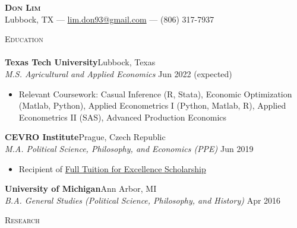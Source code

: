 \documentclass[a4paper]{article}
\newcommand{\lineunder} {
    \vspace*{-8pt} \\
    \hspace*{-18pt} \hrulefill \\
}
\newcommand{\header} [1] {
    {\hspace*{-18pt}\vspace*{6pt} \textsc{\large{#1}}}
    \vspace*{-6pt} \lineunder
}
\begin{document}
\vspace*{-40pt}

    

\vspace*{-10pt}
\begin{center}
	{\Huge \scshape \textbf{{Don Lim}}}\\
	Lubbock, TX --- \href{mailto:lim.don93@gmail.com}{lim.don93@gmail.com} --- (806) 317-7937\\
\end{center}

\header{Education}
\vspace{1mm}
\textbf{Texas Tech University}\hfill Lubbock, Texas\\
\textit{M.S. Agricultural and Applied Economics} \hfill Jun 2022 (expected)\\
\begin{itemize}[noitemsep,nolistsep]
	\item Relevant Coursework: Casual Inference (R, Stata), Economic Optimization (Matlab, Python), Applied Econometrics I (Python, Matlab, R), Applied Econometrics II (SAS), Advanced Production Economics
\end{itemize}
\vspace{1mm}
\textbf{CEVRO Institute}\hfill Prague, Czech Republic\\
\textit{M.A. Political Science, Philosophy, and Economics (PPE)} \hfill Jun 2019\\
\begin{itemize}[noitemsep,nolistsep]
	\item Recipient of \href{http://www.cevroinstitut.cz/en/article/scholarships/}{Full Tuition for Excellence Scholarship}
\end{itemize}
\vspace{1mm}
\textbf{University of Michigan}\hfill Ann Arbor, MI\\
\textit{B.A. General Studies (Political Science, Philosophy, and History)} \hfill Apr 2016\\
\vspace{2mm}

\header{Research}
\vspace{1mm}
\end{document}
